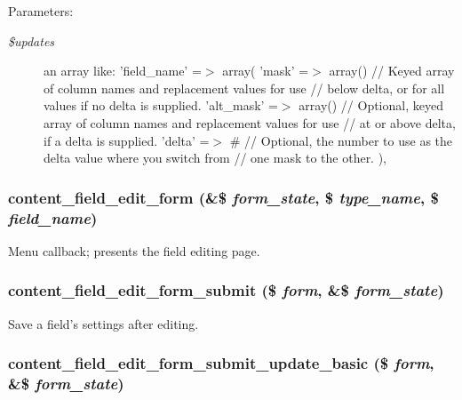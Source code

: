 \begin{Desc}
\item[Parameters:]
\begin{description}
\item[{\em \$updates}]an array like: 'field\_\-name' =$>$ array( 'mask' =$>$ array() // Keyed array of column names and replacement values for use // below delta, or for all values if no delta is supplied. 'alt\_\-mask' =$>$ array() // Optional, keyed array of column names and replacement values for use // at or above delta, if a delta is supplied. 'delta' =$>$ \# // Optional, the number to use as the delta value where you switch from // one mask to the other. ), \end{description}
\end{Desc}
\hypertarget{content_8admin_8inc_ef005d4ee9d89ec487e171fd9c45a31c}{
\subsubsection[{content\_\-field\_\-edit\_\-form}]{\setlength{\rightskip}{0pt plus 5cm}content\_\-field\_\-edit\_\-form (\&\$ {\em form\_\-state}, \/  \$ {\em type\_\-name}, \/  \$ {\em field\_\-name})}}
\label{content_8admin_8inc_ef005d4ee9d89ec487e171fd9c45a31c}


Menu callback; presents the field editing page. \hypertarget{content_8admin_8inc_d9126913d3d2d3dcb9cedf55cb79a051}{
\subsubsection[{content\_\-field\_\-edit\_\-form\_\-submit}]{\setlength{\rightskip}{0pt plus 5cm}content\_\-field\_\-edit\_\-form\_\-submit (\$ {\em form}, \/  \&\$ {\em form\_\-state})}}
\label{content_8admin_8inc_d9126913d3d2d3dcb9cedf55cb79a051}


Save a field's settings after editing. \hypertarget{content_8admin_8inc_785df3109e619884bd661692a560e88a}{
\subsubsection[{content\_\-field\_\-edit\_\-form\_\-submit\_\-update\_\-basic}]{\setlength{\rightskip}{0pt plus 5cm}content\_\-field\_\-edit\_\-form\_\-submit\_\-update\_\-basic (\$ {\em form}, \/  \&\$ {\em form\_\-state})}}
\label{content_8admin_8inc_785df3109e619884bd661692a560e88a}


